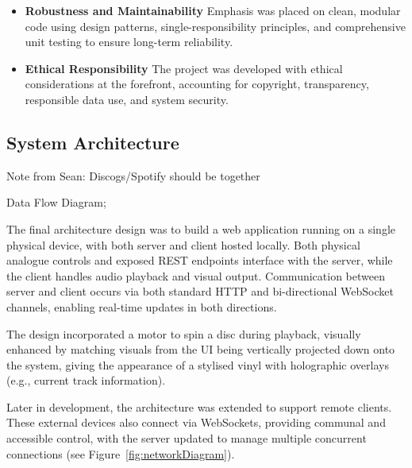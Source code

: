             \begin{itemize}
                \item \textbf{Robustness and Maintainability} Emphasis was placed on clean, modular code using design patterns, single-responsibility principles, and comprehensive unit testing to ensure long-term reliability.
            \end{itemize}
    
            \begin{itemize}
                \item \textbf{Ethical Responsibility} The project was developed with ethical considerations at the forefront, accounting for copyright, transparency, responsible data use, and system security.
            \end{itemize}
        
        \subsection{System Architecture} %
    
            \begin{temp}               
                \begin{temp}Note from Sean: Discogs/Spotify should be together\end{temp}
                
                Data Flow Diagram;
            \end{temp}
    
            The final architecture design was to build a web application running on a single physical device, with both server and client hosted locally. Both physical analogue controls and exposed REST endpoints interface with the server, while the client handles audio playback and visual output. Communication between server and client occurs via both standard HTTP and bi-directional WebSocket channels, enabling real-time updates in both directions.
    
            The design incorporated a motor to spin a disc during playback, visually enhanced by matching visuals from the UI being vertically projected down onto the system, giving the appearance of a stylised vinyl with holographic overlays (e.g., current track information).
    
            Later in development, the architecture was extended to support remote clients. These external devices also connect via WebSockets, providing communal and accessible control, with the server updated to manage multiple concurrent connections (see Figure~\ref{fig:networkDiagram}).
        
